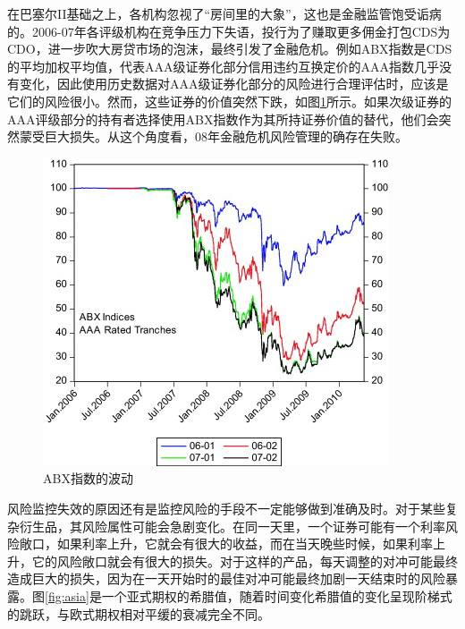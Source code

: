 在巴塞尔II基础之上，各机构忽视了“房间里的大象”，这也是金融监管饱受诟病的。2006-07年各评级机构在竞争压力下失语，投行为了赚取更多佣金打包CDS为CDO，进一步吹大房贷市场的泡沫，最终引发了金融危机。例如ABX指数是CDS的平均加权平均值，代表AAA级证券化部分信用违约互换定价的AAA指数几乎没有变化，因此使用历史数据对AAA级证券化部分的风险进行合理评估时，应该是它们的风险很小。然而，这些证券的价值突然下跌，如图\ref{fig:abx}所示。如果次级证券的AAA评级部分的持有者选择使用ABX指数作为其所持证券价值的替代，他们会突然蒙受巨大损失。从这个角度看，08年金融危机风险管理的确存在失败。
\begin{figure}[H]
    \includegraphics[width=\linewidth]{img/abx.jpg}
    \caption{ABX指数的波动}
    \label{fig:abx}
\end{figure}

风险监控失效的原因还有是监控风险的手段不一定能够做到准确及时。对于某些复杂衍生品，其风险属性可能会急剧变化。在同一天里，一个证券可能有一个利率风险敞口，如果利率上升，它就会有很大的收益，而在当天晚些时候，如果利率上升，它的风险敞口就会有很大的损失。对于这样的产品，每天调整的对冲可能最终造成巨大的损失，因为在一天开始时的最佳对冲可能最终加剧一天结束时的风险暴露。图\ref{fig:asia}是一个亚式期权的希腊值，随着时间变化希腊值的变化呈现阶梯式的跳跃，与欧式期权相对平缓的衰减完全不同。

